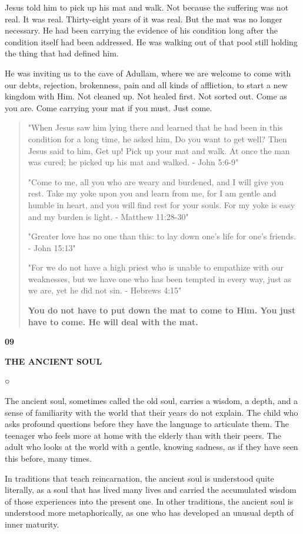 Jesus told him to pick up his mat and walk. Not because the suffering
was not real. It was real. Thirty-eight years of it was real. But the
mat was no longer necessary. He had been carrying the evidence of his
condition long after the condition itself had been addressed. He was
walking out of that pool still holding the thing that had defined him.

He was inviting us to the cave of Adullam, where we are welcome to come
with our debts, rejection, brokenness, pain and all kinds of affliction,
to start a new kingdom with Him. Not cleaned up. Not healed first. Not
sorted out. Come as you are. Come carrying your mat if you must. Just
come.

\begin{quote}
"When Jesus saw him lying there and learned that he had been in this
condition for a long time, he asked him, Do you want to get well? Then
Jesus said to him, Get up! Pick up your mat and walk. At once the man
was cured; he picked up his mat and walked. - John 5:6-9"

"Come to me, all you who are weary and burdened, and I will give you
rest. Take my yoke upon you and learn from me, for I am gentle and
humble in heart, and you will find rest for your souls. For my yoke is
easy and my burden is light. - Matthew 11:28-30"

"Greater love has no one than this: to lay down one's life for one's
friends. - John 15:13"

"For we do not have a high priest who is unable to empathize with our
weaknesses, but we have one who has been tempted in every way, just as
we are, yet he did not sin. - Hebrews 4:15"

\textbf{You do not have to put down the mat to come to Him. You just
have to come. He will deal with the mat.}
\end{quote}

\textbf{09}

\textbf{THE ANCIENT SOUL}

○

The ancient soul, sometimes called the old soul, carries a wisdom, a
depth, and a sense of familiarity with the world that their years do not
explain. The child who asks profound questions before they have the
language to articulate them. The teenager who feels more at home with
the elderly than with their peers. The adult who looks at the world with
a gentle, knowing sadness, as if they have seen this before, many times.

In traditions that teach reincarnation, the ancient soul is understood
quite literally, as a soul that has lived many lives and carried the
accumulated wisdom of those experiences into the present one. In other
traditions, the ancient soul is understood more metaphorically, as one
who has developed an unusual depth of inner maturity.

